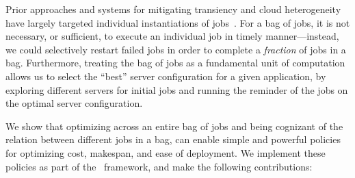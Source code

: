 Prior approaches and systems for mitigating transiency and cloud heterogeneity have largely targeted individual instantiations of jobs~\cite{spoton, exosphere, flint, marathe2014exploiting}. 
%
For a bag of jobs, it is not necessary, or sufficient, to execute an individual job in timely manner---instead, we could selectively restart failed jobs in order to complete a \emph{fraction} of jobs in a bag. 
%
Furthermore, treating the bag of jobs as a fundamental unit of computation allows us to select the ``best'' server configuration for a given application, by exploring different servers for initial jobs and running the reminder of the jobs on the optimal server configuration. 


%
We show that optimizing across an entire bag of jobs and being cognizant of the relation between different jobs in a bag, can enable simple and powerful policies for optimizing cost, makespan, and ease of deployment.
%
We implement these policies as part of the \sysname~framework, and make the following contributions:
\vspace*{-6pt}
